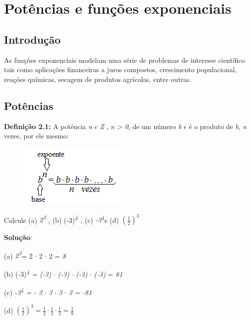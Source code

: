 \chapter{Potências e funções exponenciais}

\section{Introdução}

As funções exponenciais modelam uma série de problemas de interesse científico tais como aplicações financeiras a juros compostos, crescimento populacional, reações químicas, secagem de produtos agrícolas, entre outras.

\section{Potências}

\begin{caixa}
\textbf{Definição 2.1: }A potência \textit{n $ \epsilon $  Z}  , \textit{n > 0}, de um número \textit{b $ \epsilon $   } é o produto de \textit{b}, \textit{n} vezes, por ele mesmo:

\begin{figure}[H]
	\begin{Center}
		\includegraphics[width=2.05in,height=1.2in]{capitulos/potencias_e_funcoes_exponenciais/media/image2.png}
	\end{Center}
\end{figure}
\end{caixa}

\begin{texemplo}
Calcule  (a) \textit{2\textsuperscript{3}} , (b) (-3)\textit{\textsuperscript{4} ,} (c) \textit{-3\textsuperscript{4}}e  (d)  \(  \left( \frac{1}{2} \right) ^{3} \) 

\textbf{Solução}: 

(a) \textit{2\textsuperscript{3}}= 2 $ \cdot $  2 $ \cdot $  2  = \textit{8}

(b) (-3)\textit{\textsuperscript{4} = (-3)} $ \cdot $  \textit{(-3)} $ \cdot $  \textit{(-3)} $ \cdot $  \textit{(-3)} = \textit{81 }

(c) \textit{-3\textsuperscript{4} = - 3} $ \cdot $  \textit{3} $ \cdot $  \textit{3} $ \cdot $ \textit{3 = -81}

(d)  \(  \left( \frac{1}{2} \right) ^{3}=\frac{1}{2}  \cdot \frac{1}{2} \cdot \frac{1}{2}=\frac{1}{8} \) 
\end{texemplo}


